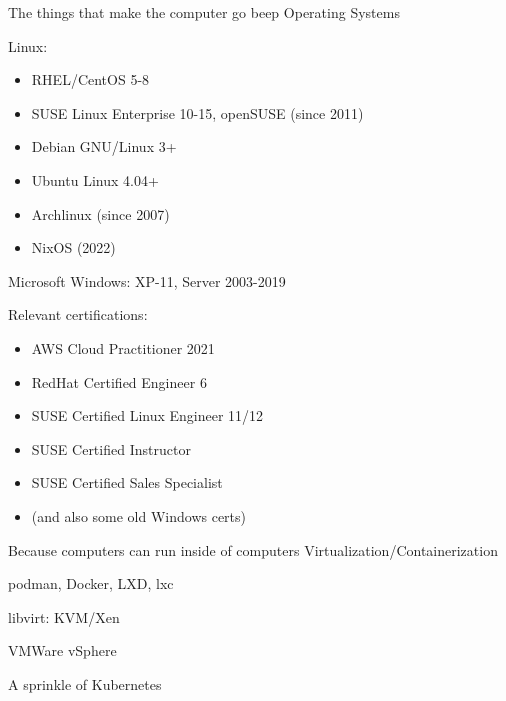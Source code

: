 

\begin{cventries}
  \cventry
    {The things that make the computer go beep}
    {Operating Systems}
		{}
    {}
    {
			\begin{cvitems}
				\item Linux:
          \begin{itemize}
            \item RHEL/CentOS 5-8
            \item SUSE Linux Enterprise 10-15, openSUSE (since 2011)
            \item Debian GNU/Linux 3+
            \item Ubuntu Linux 4.04+
            \item Archlinux (since 2007)
            \item NixOS (2022)
          \end{itemize}
				\item Microsoft Windows: XP-11, Server 2003-2019
        \item Relevant certifications:
          \begin{itemize}
            \item AWS Cloud Practitioner 2021
            \item RedHat Certified Engineer 6
            \item SUSE Certified Linux Engineer 11/12
            \item SUSE Certified Instructor
            \item SUSE Certified Sales Specialist
            \item (and also some old Windows certs)
          \end{itemize}
      \end{cvitems}
    }
  \cventry
    {Because computers can run inside of computers}
    {Virtualization/Containerization}
    {}
    {}
    {
      \begin{cvitems}
        \item podman, Docker, LXD, lxc
        \item libvirt: KVM/Xen
        \item VMWare vSphere
        \item A sprinkle of Kubernetes
      \end{cvitems}
}
\end{cventries}
